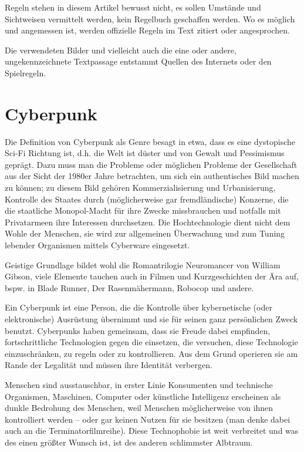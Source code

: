 \documentclass[a4paper]{scrartcl}
\begin{document}
Regeln stehen in diesem Artikel bewusst nicht, es sollen Umstände und Sichtweisen vermittelt werden, kein Regelbuch geschaffen werden.
Wo es möglich und angemessen ist, werden offizielle Regeln im Text zitiert oder angesprochen.

Die verwendeten Bilder und vielleicht auch die eine oder andere, ungekennzeichnete Textpassage entstammt Quellen des Internets oder den Spielregeln.

\section{Cyberpunk}
Die Definition von Cyberpunk als Genre besagt in etwa, dass es eine dystopische Sci-Fi Richtung ist,
d.h. die Welt ist düster und von Gewalt und Pessimismus geprägt.
Dazu muss man die Probleme oder möglichen Probleme der Gesellschaft aus der Sicht der 1980er Jahre betrachten,
um sich ein authentisches Bild machen zu können; zu diesem Bild gehören Kommerzialisierung und Urbanisierung,
Kontrolle des Staates durch (möglicherweise gar fremdländische) Konzerne, die die staatliche Monopol-Macht für ihre 
Zwecke missbrauchen und notfalls mit Privatarmeen ihre Interessen durchsetzen.
Die Hochtechnologie dient nicht dem Wohle der Menschen, sie wird zur allgemeinen Überwachung und zum Tuning lebender
Organismen mittels Cyberware eingesetzt.

Geistige Grundlage bildet wohl die Romantrilogie \glqq Neuromancer\grqq{} von William Gibson, viele Elemente tauchen 
auch in Filmen und Kurzgeschichten der Ära auf, bspw. in Blade Runner, Der Rasenmähermann, Robocop und andere.

Ein Cyberpunk ist eine Person, die die Kontrolle über kybernetische (oder elektronische) Ausrüstung übernimmt und sie 
für seinen ganz persönlichen Zweck benutzt. Cyberpunks haben gemeinsam, dass sie Freude dabei empfinden, fortschrittliche
Technologien gegen die einsetzen, die versuchen, diese Technologie einzuschränken, zu regeln oder zu kontrollieren.
Aus dem Grund operieren sie am Rande der Legalität und müssen ihre Identität verbergen.

Menschen sind ausstauschbar, in erster Linie Konsumenten und technische Organismen, Maschinen, Computer oder künstliche
Intelligenz erscheinen als dunkle Bedrohung des Menschen, weil Menschen möglicherweise von ihnen kontrolliert werden 
-- oder gar keinen Nutzen für sie besitzen (man denke dabei auch an die Terminatorfilmreihe).
Diese Technophobie ist weit verbreitet und was des einen größter Wunsch ist, ist des anderen schlimmster Albtraum.
\end{document}
